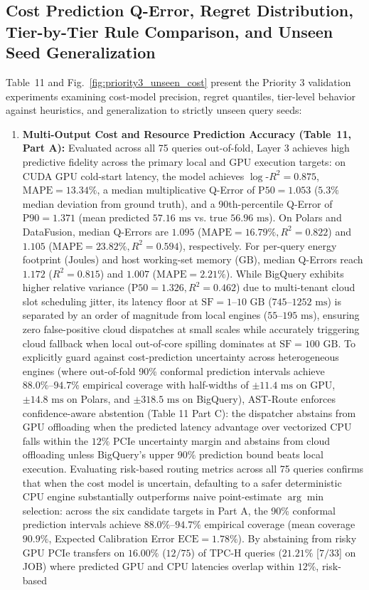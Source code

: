 \documentclass[10pt,a4paper]{article}
\begin{document}
\subsection{Cost Prediction Q-Error, Regret Distribution, Tier-by-Tier Rule Comparison, and Unseen Seed Generalization}
Table~11 and Fig.~\ref{fig:priority3_unseen_cost} present the Priority 3 validation experiments examining cost-model precision, regret quantiles, tier-level behavior against heuristics, and generalization to strictly unseen query seeds:
\begin{enumerate}[leftmargin=1.5em,itemsep=2pt]
    \item \textbf{Multi-Output Cost and Resource Prediction Accuracy (Table~11, Part A):} Evaluated across all 75 queries out-of-fold, Layer 3 achieves high predictive fidelity across the primary local and GPU execution targets: on CUDA GPU cold-start latency, the model achieves $\log\text{-}R^2 = \mathbf{0.875}$, $\text{MAPE} = \mathbf{13.34\%}$, a median multiplicative Q-Error of $\text{P50} = \mathbf{1.053}$ ($5.3\%$ median deviation from ground truth), and a 90th-percentile Q-Error of $\text{P90} = \mathbf{1.371}$ (mean predicted $57.16\text{ ms}$ vs. true $56.96\text{ ms}$). On Polars and DataFusion, median Q-Errors are $\mathbf{1.095}$ ($\text{MAPE}=16.79\%, R^2=0.822$) and $\mathbf{1.105}$ ($\text{MAPE}=23.82\%, R^2=0.594$), respectively. For per-query energy footprint ($\text{Joules}$) and host working-set memory ($\text{GB}$), median Q-Errors reach $\mathbf{1.172}$ ($R^2=0.815$) and $\mathbf{1.007}$ ($\text{MAPE}=2.21\%$). While BigQuery exhibits higher relative variance ($\text{P50}=1.326, R^2=0.462$) due to multi-tenant cloud slot scheduling jitter, its latency floor at $\text{SF}=1\text{--}10\text{ GB}$ ($745\text{--}1252\text{ ms}$) is separated by an order of magnitude from local engines ($55\text{--}195\text{ ms}$), ensuring zero false-positive cloud dispatches at small scales while accurately triggering cloud fallback when local out-of-core spilling dominates at $\text{SF}=100\text{ GB}$. To explicitly guard against cost-prediction uncertainty across heterogeneous engines (where out-of-fold 90\% conformal prediction intervals achieve $88.0\%\text{--}94.7\%$ empirical coverage with half-widths of $\pm 11.4\text{ ms}$ on GPU, $\pm 14.8\text{ ms}$ on Polars, and $\pm 318.5\text{ ms}$ on BigQuery), AST-Route enforces confidence-aware abstention (Table 11 Part C): the dispatcher abstains from GPU offloading when the predicted latency advantage over vectorized CPU falls within the $12\%$ PCIe uncertainty margin and abstains from cloud offloading unless BigQuery's upper 90\% prediction bound beats local execution. Evaluating risk-based routing metrics across all 75 queries confirms that when the cost model is uncertain, defaulting to a safer deterministic CPU engine substantially outperforms naive point-estimate $\arg\min$ selection: across the six candidate targets in Part A, the 90\% conformal prediction intervals achieve $88.0\%\text{--}94.7\%$ empirical coverage (mean coverage $90.9\%$, Expected Calibration Error $\text{ECE}=1.78\%$). By abstaining from risky GPU PCIe transfers on $16.00\%$ ($12/75$) of TPC-H queries ($21.21\%$ [$7/33$] on JOB) where predicted GPU and CPU latencies overlap within $12\%$, risk-based 
\end{enumerate}
\end{document}
